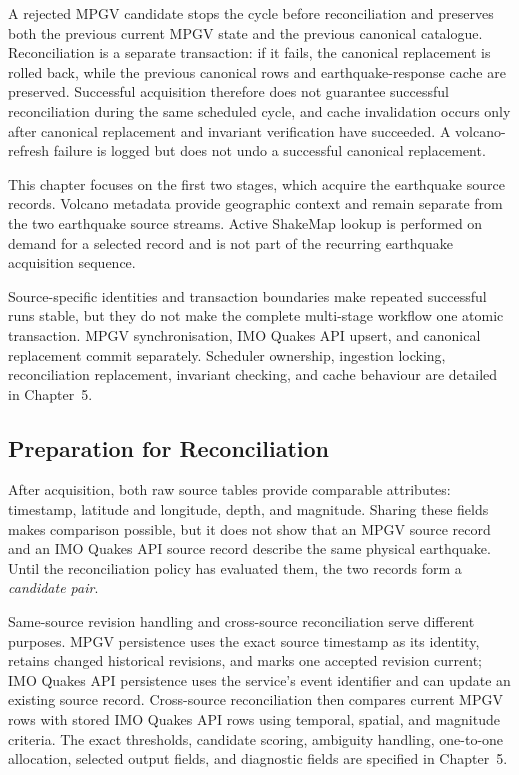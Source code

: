 \documentclass[12pt]{article}
\begin{document}
A rejected MPGV candidate stops the cycle before reconciliation and preserves both the previous current MPGV state and the previous canonical catalogue. Reconciliation is a separate transaction: if it fails, the canonical replacement is rolled back, while the previous canonical rows and earthquake-response cache are preserved. Successful acquisition therefore does not guarantee successful reconciliation during the same scheduled cycle, and cache invalidation occurs only after canonical replacement and invariant verification have succeeded. A volcano-refresh failure is logged but does not undo a successful canonical replacement.


This chapter focuses on the first two stages, which acquire the earthquake source records. Volcano metadata provide geographic context and remain separate from the two earthquake source streams. Active ShakeMap lookup is performed on demand for a selected record and is not part of the recurring earthquake acquisition sequence.

Source-specific identities and transaction boundaries make repeated successful runs stable, but they do not make the complete multi-stage workflow one atomic transaction. MPGV synchronisation, IMO Quakes API upsert, and canonical replacement commit separately. Scheduler ownership, ingestion locking, reconciliation replacement, invariant checking, and cache behaviour are detailed in Chapter~5.

\subsection{Preparation for Reconciliation}
\label{subsec:preparation-for-reconciliation}

After acquisition, both raw source tables provide comparable attributes: timestamp, latitude and longitude, depth, and magnitude. Sharing these fields makes comparison possible, but it does not show that an MPGV source record and an IMO Quakes API source record describe the same physical earthquake. Until the reconciliation policy has evaluated them, the two records form a \emph{candidate pair}.

Same-source revision handling and cross-source reconciliation serve different purposes. MPGV persistence uses the exact source timestamp as its identity, retains changed historical revisions, and marks one accepted revision current; IMO Quakes API persistence uses the service's event identifier and can update an existing source record. Cross-source reconciliation then compares current MPGV rows with stored IMO Quakes API rows using temporal, spatial, and magnitude criteria. The exact thresholds, candidate scoring, ambiguity handling, one-to-one allocation, selected output fields, and diagnostic fields are specified in Chapter~5.
\end{document}

